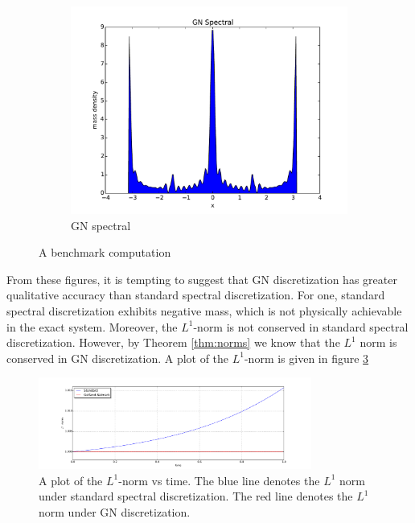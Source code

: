\documentclass[12pt]{amsart}
\begin{document}
\begin{figure}
\begin{subfigure}{0.3\textwidth}
		\includegraphics[width=\textwidth]{./images/gn_spectral_1D.pdf}
		\caption{GN spectral}
		\label{fig:gn spectral}
	\end{subfigure}
	\caption{A benchmark computation}
	\label{fig:S1}
\end{figure}

From these figures, it is tempting to suggest that GN discretization has greater qualitative accuracy than standard spectral discretization.
For one, standard spectral discretization exhibits negative mass, which is not physically achievable in the exact system.
Moreover, the $L^{1}$-norm is not conserved in standard spectral discretization.  However, by Theorem \ref{thm:norms} we know that
the $L^{1}$ norm is conserved in GN discretization.
A plot of the $L^{1}$-norm is given in figure \ref{fig:L1}

\begin{figure}
	\centering
	\includegraphics[width=0.8\textwidth]{./images/L1_plot.pdf}
	\caption{A plot of the $L^{1}$-norm vs time.
		The blue line denotes the $L^{1}$ norm under standard spectral discretization.
		The red line denotes the $L^{1}$ norm under GN discretization.
	}
	\label{fig:L1}
\end{figure}
\end{document}
